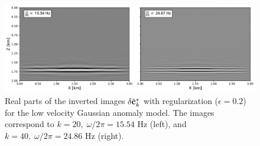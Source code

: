 \begin{figure}[h]
\centering
\includegraphics[width=\linewidth]{Fig/inverted-images-reg-anomaly.pdf}

\vspace*{-0.5cm}
\caption{Real parts of the inverted images $\delta \hat{\mathbf{c}}^{\ast}_k$ with regularization ($\epsilon = 0.2$) for the low velocity Gaussian anomaly model. The images correspond to $k = 20,\; \omega / 2 \pi = 15.54$ Hz (left), and $k = 40,\; \omega / 2 \pi = 24.86$ Hz (right).}
\label{fig:example1_images_reg}
\end{figure}